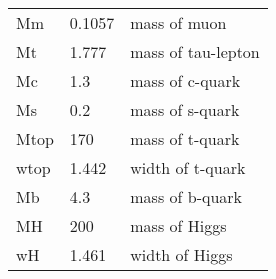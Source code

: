 \begin{center}
\begin{tabular}{|l|l|l|}
Mm    &0.1057              &mass of muon \\
Mt    &1.777               &mass of tau-lepton \\
Mc    &1.3                 &mass of c-quark \\
Ms    &0.2                 &mass of s-quark \\
Mtop  &170                 &mass of t-quark \\
wtop  &1.442               &width of t-quark \\
Mb    &4.3                 &mass of b-quark \\
MH    &200                 &mass of Higgs \\
wH    &1.461               &width of Higgs \\ \hline
\end{tabular}


\end{center}


